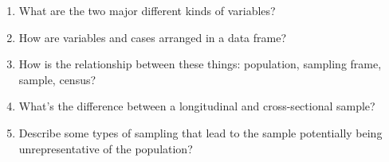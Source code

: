 

\begin{enumerate}
\item What are the two major different kinds of variables?\\
\TextEntry

\item How are variables and cases arranged in a data frame?\\
\TextEntry

\item How is the relationship between these things: population,
  sampling frame, sample, census?\\
\TextEntry

\item What's the difference between a longitudinal and cross-sectional
  sample?\\
\TextEntry

\item Describe some types of sampling that lead to the sample
  potentially being unrepresentative of the population?\\
\TextEntry

\end{enumerate}
